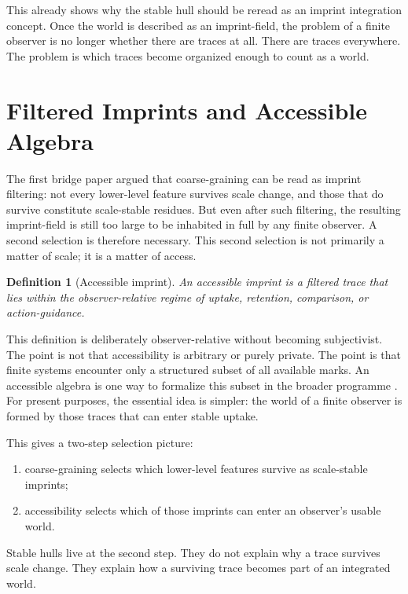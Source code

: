 \documentclass[12pt]{article}
\newtheorem{definition}{Definition}[section]
\begin{document}
This already shows why the stable hull should be reread as an imprint integration concept. Once the world is described as an imprint-field, the problem of a finite observer is no longer whether there are traces at all. There are traces everywhere. The problem is which traces become organized enough to count as a world.

\section{Filtered Imprints and Accessible Algebra}

The first bridge paper argued that coarse-graining can be read as imprint filtering: not every lower-level feature survives scale change, and those that do survive constitute scale-stable residues. But even after such filtering, the resulting imprint-field is still too large to be inhabited in full by any finite observer. A second selection is therefore necessary. This second selection is not primarily a matter of scale; it is a matter of access.

\begin{definition}[Accessible imprint]
An \emph{accessible imprint} is a filtered trace that lies within the observer-relative regime of uptake, retention, comparison, or action-guidance.
\end{definition}

This definition is deliberately observer-relative without becoming subjectivist. The point is not that accessibility is arbitrary or purely private. The point is that finite systems encounter only a structured subset of all available marks. An accessible algebra is one way to formalize this subset in the broader programme \cite{FoundationI,FoundationII}. For present purposes, the essential idea is simpler: the world of a finite observer is formed by those traces that can enter stable uptake.

This gives a two-step selection picture:

\begin{enumerate}
\item coarse-graining selects which lower-level features survive as scale-stable imprints;
\item accessibility selects which of those imprints can enter an observer's usable world.
\end{enumerate}

Stable hulls live at the second step. They do not explain why a trace survives scale change. They explain how a surviving trace becomes part of an integrated world.
\end{document}
